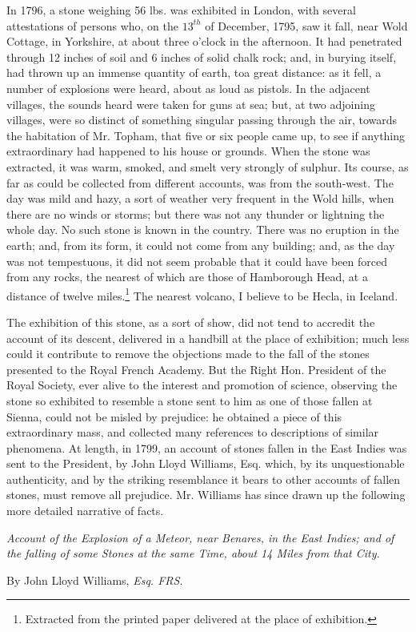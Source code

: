\documentclass[a4paper, 12pt, oneside]{article}
\begin{document}
In 1796, a stone weighing 56 lbs. was exhibited in London, with several attestations of persons who, on the $13^{th}$ of December, 1795, saw it fall, near Wold Cottage, in Yorkshire, at about three o'clock in the afternoon. It had penetrated through 12 inches of soil and 6 inches of solid chalk rock; and, in burying itself, had thrown up an immense quantity of earth, toa great distance: as it fell, a number of explosions were heard, about as loud as pistols. In the adjacent villages, the sounds heard were taken for guns at sea; but, at two adjoining villages, were so distinct of something singular passing through the air, towards the habitation of Mr. Topham, that five or six people came up, to see if anything extraordinary had happened to his house or grounds. When the stone was extracted, it was warm, smoked, and smelt very strongly of sulphur. Its course, as far as could be collected from different accounts, was from the south-west. The day was mild and hazy, a sort of weather very frequent in the Wold hills, when there are no winds or storms; but there was not any thunder or lightning the whole day. No such stone is known in the country. There was no eruption in the earth; and, from its form, it could not come from any building; and, as the day was not tempestuous, it did not seem probable that it could have been forced from any rocks, the nearest of which are those of Hamborough Head, at a distance of twelve miles.\footnote{Extracted from the printed paper delivered at the place of exhibition.} The nearest volcano, I believe to be Hecla, in Iceland.

The exhibition of this stone, as a sort of show, did not tend to accredit the account of its descent, delivered in a handbill at the place of exhibition; much less could it contribute to remove the objections made to the fall of the stones presented to the Royal French Academy. But the Right Hon. President of the Royal Society, ever alive to the interest and promotion of science, observing the stone so exhibited to resemble a stone sent to him as one of those fallen at Sienna, could not be misled by prejudice: he obtained a piece of this extraordinary mass, and collected many references to descriptions of similar phenomena. At length, in 1799, an account of stones fallen in the East Indies was sent to the President, by John Lloyd Williams, Esq. which, by its unquestionable authenticity, and by the striking resemblance it bears to other accounts of fallen stones, must remove all prejudice. Mr. Williams has since drawn up the following more detailed narrative of facts.
\begin{center}
\emph{Account of the Explosion of a Meteor, near Benares, in the East Indies; and of the falling of some Stones at the same Time, about 14 Miles from that City.}
\end{center}
\begin{center}
By John Lloyd Williams, \emph{Esq. FRS.}
\end{center}
\end{document}
